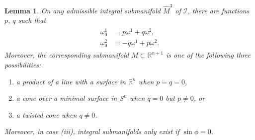 \documentclass[10pt,a4paper]{amsart}
\def\R{\mathbb{R}}
\def\calI{\mathcal{I}}
\def\w{\omega}
\def\Mhat{\widehat{M}}
\newtheorem{Lemma}[Theorem]{Lemma}
\numberwithin{equation}{section}
\begin{document}
\begin{Lemma} \label{pqprolong}
On any admissible integral submanifold $\Mhat^3$ of $\calI$, there are functions $p$, $q$ such that
\begin{gather} \label{austpq}
\begin{aligned}
\w^1_0 &= p \w^1 + q \w^2,
\\
\w^2_0 &= -q \w^1 + p \w^2.
\end{aligned}
\end{gather}
Moreover, the corresponding submanifold $M \subset \R^{n+1}$ is one of the following three possibilities:
\begin{enumerate}[$(i)$]\itemsep=0pt
\item a product of a line with a surface in $\R^n$ when $p=q=0$,
\item a cone over a minimal surface in $S^n$ when $q=0$ but $p\ne0$, or
\item a twisted cone when $q\ne 0$.
\end{enumerate}
Moreover, in case (iii), integral submanifolds only exist if $\sin\phi =0$.
\end{Lemma}
\end{document}
